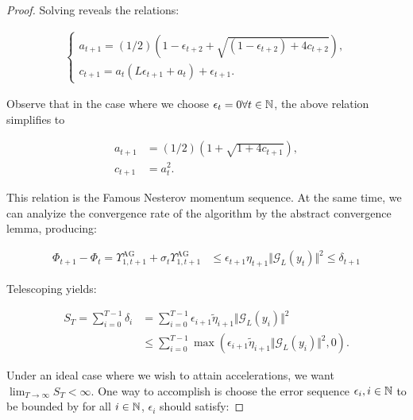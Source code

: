 \documentclass[12pt]{article}
\begin{document}
\begin{proof}
            Solving reveals the relations: 

            \begin{align*}
                \begin{cases}
                    a_{t + 1} = (1/2)\left(
                    1 - \epsilon_{t + 2} + \sqrt{(1 - \epsilon_{t + 2}) + 4 c_{t + 2}}
                    \right), 
                    \\
                    c_{t + 1} = a_t (L \epsilon_{t + 1} + a_t) + \epsilon_{t + 1}. 
                \end{cases}
            \end{align*}

            Observe that in the case where we choose $\epsilon_t = 0 \forall t \in \mathbb N$, the above relation simplifies to 

            \begin{align*}
                a_{t + 1} &= (1/2)\left(
                    1 + \sqrt{1 + 4 c_{t + 1}}
                \right), 
                \\
                c_{t + 1} &= a_t^2. 
            \end{align*}

            This relation is the Famous Nesterov momentum sequence. 
            At the same time, we can analyize the convergence rate of the algorithm by the abstract convergence lemma, producing: 

            \begin{align*}
                \Phi_{t + 1} - \Phi_t =
                \Upsilon_{1, t + 1}^\text{AG} + 
                \sigma_t\Upsilon_{1, t + 1}^{\text{AG}} 
                &\le \epsilon_{t + 1}\eta_{t + 1} \Vert \mathcal G_L(y_t)\Vert^2 \le \delta_{t + 1}
            \end{align*}

            Telescoping yields: 

            \begin{align*}
                S_{T} = 
                \sum_{i = 0}^{T- 1} \delta_i 
                &= 
                \sum_{i = 0}^{T - 1} \epsilon_{i + 1}\tilde\eta_{i + 1}\Vert \mathcal G_L(y_i)\Vert^2
                \\
                &\le \sum_{i = 0}^{T - 1}\max(\epsilon_{i + 1} \tilde\eta_{i + 1}\Vert \mathcal G_L(y_i)\Vert^2, 0). 
            \end{align*}

            Under an ideal case where we wish to attain accelerations, we want $\lim_{T \rightarrow \infty} S_T < \infty$. 
            One way to accomplish is choose the error sequence $\epsilon_i, i \in \mathbb N$ to be bounded by for all $i \in \mathbb N$, $\epsilon_i$ should satisfy: 


\end{proof}
\end{document}
